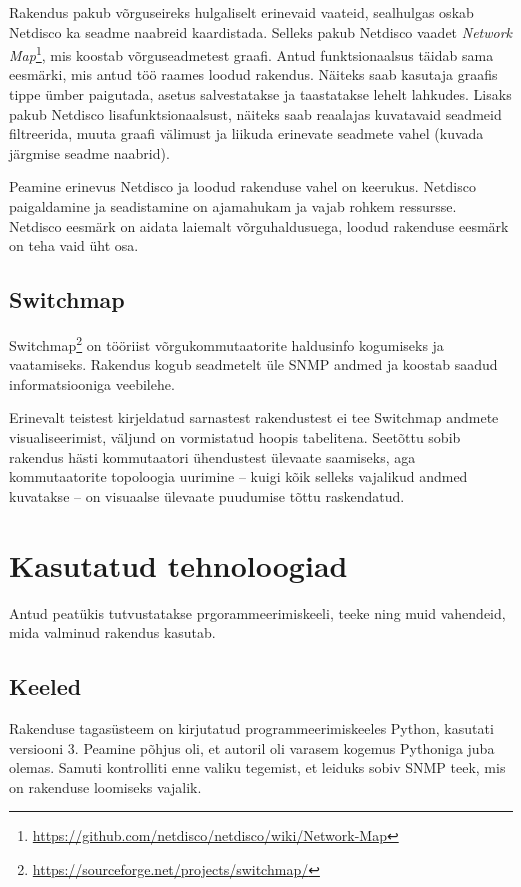 \documentclass[12pt]{article}
\begin{document}
Rakendus pakub võrguseireks hulgaliselt erinevaid vaateid, sealhulgas oskab Netdisco ka seadme
naabreid kaardistada.
Selleks pakub Netdisco vaadet
\textit{Network Map}\footnote{\url{https://github.com/netdisco/netdisco/wiki/Network-Map}},
mis koostab võrguseadmetest graafi.
Antud funktsionaalsus täidab sama eesmärki, mis antud töö raames loodud rakendus.
Näiteks saab kasutaja graafis tippe ümber paigutada, asetus salvestatakse ja taastatakse lehelt
lahkudes.
Lisaks pakub Netdisco lisafunktsionaalsust, näiteks saab reaalajas kuvatavaid seadmeid filtreerida,
muuta graafi välimust ja liikuda erinevate seadmete vahel (kuvada järgmise seadme naabrid).

Peamine erinevus Netdisco ja loodud rakenduse vahel on keerukus.
Netdisco paigaldamine ja seadistamine on ajamahukam ja vajab rohkem ressursse.
Netdisco eesmärk on aidata laiemalt võrguhaldusuega, loodud rakenduse eesmärk on teha vaid üht osa.

\subsection{Switchmap}
Switchmap\footnote{\url{https://sourceforge.net/projects/switchmap/}} on tööriist
võrgukommutaatorite haldusinfo kogumiseks ja vaatamiseks.
Rakendus kogub seadmetelt üle SNMP andmed ja koostab saadud informatsiooniga veebilehe.

Erinevalt teistest kirjeldatud sarnastest rakendustest ei tee Switchmap andmete visualiseerimist,
väljund on vormistatud hoopis tabelitena.
Seetõttu sobib rakendus hästi kommutaatori ühendustest ülevaate saamiseks, aga kommutaatorite
topoloogia uurimine -- kuigi kõik selleks vajalikud andmed kuvatakse --  on visuaalse ülevaate
puudumise tõttu raskendatud.

\newpage
\section{Kasutatud tehnoloogiad} \label{usedTech}
Antud peatükis tutvustatakse prgorammeerimiskeeli, teeke ning muid vahendeid, mida valminud
rakendus kasutab.

\subsection{Keeled}
Rakenduse tagasüsteem on kirjutatud programmeerimiskeeles Python, kasutati versiooni 3.
Peamine põhjus oli, et autoril oli varasem kogemus Pythoniga juba olemas.
Samuti kontrolliti enne valiku tegemist, et leiduks sobiv SNMP teek, mis on rakenduse loomiseks
vajalik.
\end{document}
